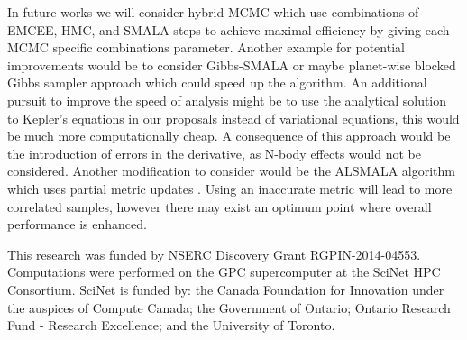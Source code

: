\documentclass{aa}
\begin{document}
In future works we will consider hybrid MCMC which use combinations of  EMCEE, HMC, and SMALA steps to achieve maximal efficiency by giving each MCMC specific combinations parameter. 
Another example for potential improvements would be to consider Gibbs-SMALA or maybe planet-wise blocked Gibbs sampler approach which could speed up the algorithm. 
An additional pursuit to improve the speed of analysis might be to use the analytical solution to Kepler's equations in our proposals instead of variational equations, this would be much more computationally cheap. 
A consequence of this approach would be the introduction of errors in the derivative, as N-body effects would not be considered. 
Another modification to consider would be the ALSMALA algorithm which uses partial metric updates \cite{1608.07986}. 
Using an inaccurate metric will lead to more correlated samples, however there may exist an optimum point where overall performance is enhanced.

\begin{acknowledgements}
	This research was funded by NSERC Discovery Grant RGPIN-2014-04553. 
Computations were performed on the GPC supercomputer at the SciNet HPC Consortium. 
SciNet is funded by: the Canada Foundation for Innovation under the auspices of Compute Canada; the Government of Ontario; Ontario Research Fund - Research Excellence; and the University of Toronto.
\end{acknowledgements}





\end{document}

